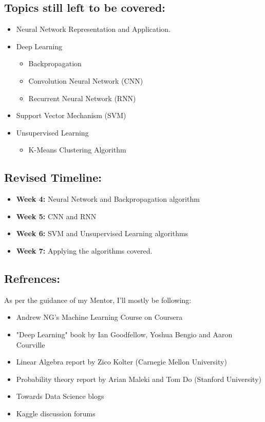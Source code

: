 \subsection*{Topics still left to be covered:}
	\begin{itemize}
		\item Neural Network Representation and Application.
		\item Deep Learning
		\begin{itemize}
			\item Backpropagation
			\item Convolution Neural Network (CNN)
			\item Recurrent Neural Network (RNN)
		\end{itemize}
		\item Support Vector Mechanism (SVM)
		\item Unsupervised Learning
		\begin{itemize}
			\item K-Means Clustering Algorithm 
		\end{itemize}
	\end{itemize}

\subsection*{Revised Timeline:}
	\begin{itemize}
		\item \textbf{Week 4:} Neural Network and Backpropagation algorithm
		\item \textbf{Week 5:} CNN and RNN
		\item \textbf{Week 6:} SVM and Unsupervised Learning algorithms
		\item \textbf{Week 7:} Applying the algorithms covered.
	\end{itemize}

\subsection*{Refrences:}
	As per the guidance of my Mentor, I'll mostly be following:
	\begin{itemize}
		\item Andrew NG's Machine Learning Course on Coursera
		\item "Deep Learning" book by Ian Goodfellow, Yoshua Bengio and Aaron Courville 
		\item Linear Algebra report by Zico Kolter (Carnegie Mellon University)
		\item Probability theory report by Arian Maleki and Tom Do (Stanford University)
		\item Towards Data Science blogs
		\item Kaggle discussion forums
	\end{itemize}


